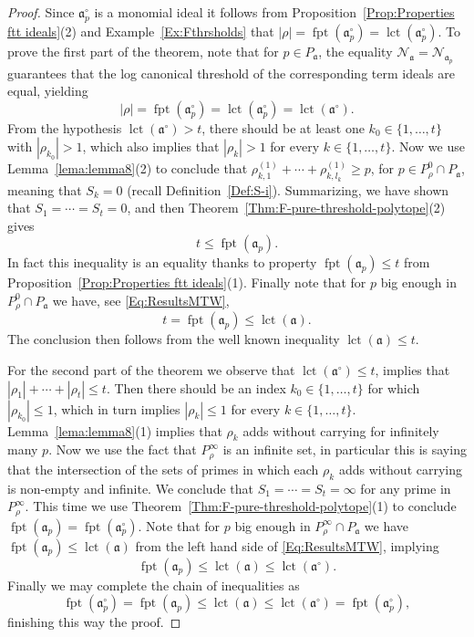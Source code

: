 \documentclass[12pt]{amsart}
\theoremstyle{definition}
\numberwithin{equation}{subsection}
\DeclareMathOperator{\fpt}{fpt}
\newcommand{\lct}{{\operatorname{lct}}}
\newcommand{\fa}{\mathfrak{a}}
\newcommand{\N}{\mathcal{N}}
\renewcommand{\!}[1]{{\color{red}\text{\Huge$\star$ }#1}}
\begin{document}
\begin{proof}
	Since $\fa_p^\circ$ is a monomial ideal it follows from Proposition~\ref{Prop:Properties ftt ideals}(2) and Example~\ref{Ex:Fthrsholds} that 
	$|\rho|=\fpt(\fa_p^\circ)=\lct(\fa_p^\circ)$. To prove the first part of the theorem, note that for $p\in P_\fa$, the equality $\N_{\fa}=\N_{\fa_p}$ guarantees that the log canonical threshold of the corresponding term ideals are equal, yielding
	\begin{equation}\label{Eq:EqualityFPTs}
		|\rho|=\fpt(\fa_p^\circ)=\lct(\fa_p^\circ)=\lct(\fa^\circ).
	\end{equation}
	From the hypothesis $\lct(\fa^\circ)>t$, there should be at least one $k_0\in\{1,\ldots,t\}$ with $|\rho_{k_0}|>1$, which also implies that $|\rho_k|>1$ for every $k\in\{1,\ldots,t\}$. Now we use Lemma~\ref{lema:lemma8}(2) to conclude that $\rho_{k,1}^{(1)}+ \cdots + \rho_{k,l_{k}}^{(1)} \geq p$, for $p\in P_\rho^0\cap P_\fa$, meaning that $S_{k}=0$ (recall Definition~\ref{Def:S-i}). Summarizing, we have shown that $S_1=\cdots=S_t=0$, and then Theorem~\ref{Thm:F-pure-threshold-polytope}(2) gives
	\begin{equation*}\label{Eq:InequalityFPT} 
		t\leq \fpt(\fa_p).
	\end{equation*}
	In fact this inequality is an equality thanks to property $\fpt(\fa_p) \leq t$ from Proposition~\ref{Prop:Properties ftt ideals}(1). Finally note that for $p$ big enough in $P_\rho^0\cap P_\fa$ we have, see \eqref{Eq:ResultsMTW}, 
		\[t=\fpt(\fa_p)\leq \lct(\fa).\]
	The conclusion then follows from the well known inequality $\lct(\fa) \leq t$.

	For the second part of the theorem we observe that  $\lct(\fa^\circ)\leq t$, implies that $|\rho_1|+\cdots+|\rho_t|\leq t$. Then there should be an index $k_0\in\{1,\ldots,t\}$ for which $|\rho_{k_0}|\leq 1$, which in turn implies $|\rho_k|\leq 1$ for every $k\in\{1,\ldots,t\}$. Lemma~\ref{lema:lemma8}(1) implies that $\rho_{k}$ adds without carrying for infinitely many $p$. Now we use the fact that 
	$P_\rho^\infty$ is an infinite set, in particular this is saying that the intersection of the sets of primes in which each $\rho_{k}$ adds without carrying is non-empty and infinite. We conclude that $S_1=\cdots=S_t=\infty$ for any prime in $P_\rho^\infty$. This time we use Theorem~\ref{Thm:F-pure-threshold-polytope}(1) to conclude $\fpt(\fa_p)=\fpt(\fa_p^\circ)$. Note that for $p$ big enough in $P_\rho^\infty\cap P_\fa$ we have $\fpt(\fa_p)\leq \lct(\fa)$ from the left hand side of \eqref{Eq:ResultsMTW}, implying 
	$$\fpt(\fa_p)\leq \lct(\fa) \leq \lct(\fa^\circ).$$ Finally we may complete the chain of inequalities as $$\fpt(\fa_p^\circ)=\fpt(\fa_p)\leq \lct(\fa) \leq \lct(\fa^\circ)=\fpt(\fa_p^\circ),$$ finishing this way the proof.  
\end{proof}
\end{document}
